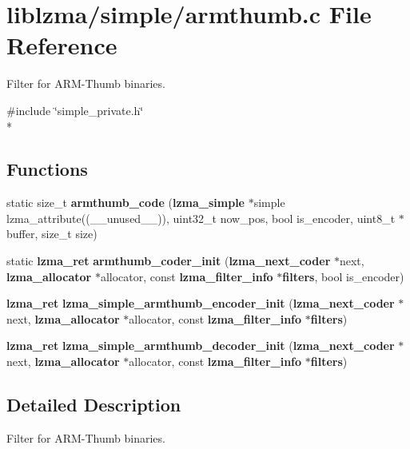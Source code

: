 \section{liblzma/simple/armthumb.c File Reference}
\label{armthumb_8c}


Filter for A\-R\-M-\/\-Thumb binaries.  


{\ttfamily \#include \char`\"{}simple\-\_\-private.\-h\char`\"{}}\\*
\subsection*{Functions}
\begin{DoxyCompactItemize}
\item 
static size\-\_\-t {\bfseries armthumb\-\_\-code} ({\bf lzma\-\_\-simple} $\ast$simple lzma\-\_\-attribute((\-\_\-\-\_\-unused\-\_\-\-\_\-)), uint32\-\_\-t now\-\_\-pos, bool is\-\_\-encoder, uint8\-\_\-t $\ast$buffer, size\-\_\-t size)\label{armthumb_8c_a2d6288004570ee4d67f219ea31bb9fb8}

\item 
static {\bf lzma\-\_\-ret} {\bfseries armthumb\-\_\-coder\-\_\-init} ({\bf lzma\-\_\-next\-\_\-coder} $\ast$next, {\bf lzma\-\_\-allocator} $\ast$allocator, const {\bf lzma\-\_\-filter\-\_\-info} $\ast${\bf filters}, bool is\-\_\-encoder)\label{armthumb_8c_ae0e7c805fb1a7ae1a7edcef150846b2b}

\item 
{\bf lzma\-\_\-ret} {\bfseries lzma\-\_\-simple\-\_\-armthumb\-\_\-encoder\-\_\-init} ({\bf lzma\-\_\-next\-\_\-coder} $\ast$next, {\bf lzma\-\_\-allocator} $\ast$allocator, const {\bf lzma\-\_\-filter\-\_\-info} $\ast${\bf filters})\label{armthumb_8c_ad6ccc91844d17926a54d300b371d4293}

\item 
{\bf lzma\-\_\-ret} {\bfseries lzma\-\_\-simple\-\_\-armthumb\-\_\-decoder\-\_\-init} ({\bf lzma\-\_\-next\-\_\-coder} $\ast$next, {\bf lzma\-\_\-allocator} $\ast$allocator, const {\bf lzma\-\_\-filter\-\_\-info} $\ast${\bf filters})\label{armthumb_8c_a640c44d479fc2ca11a8408ca75d63493}

\end{DoxyCompactItemize}


\subsection{Detailed Description}
Filter for A\-R\-M-\/\-Thumb binaries. 